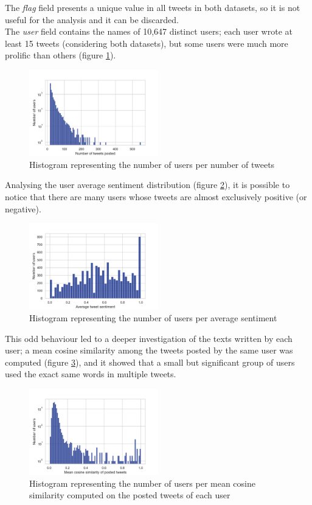 \documentclass[conference]{IEEEtran}
\begin{document}
The \textit{flag} field presents a unique value in all tweets in both datasets, so it is not useful for the analysis and it can be discarded. \\
The \textit{user} field contains the names of 10,647 distinct users; each user wrote at least 15 tweets (considering both datasets), but some users were much more prolific than others (figure \ref{fig:user_per_tweet}).
\begin{figure}
    \includegraphics[width=0.5\textwidth]{user_per_tweet}
    \caption[Histogram of users per tweets]{Histogram representing the number of users per number of tweets}
    \label{fig:user_per_tweet}
\end{figure}
Analysing the user average sentiment distribution (figure \ref{fig:average_user_sentiment}), it is possible to notice that there are many users whose tweets are almost exclusively positive (or negative).
\begin{figure}
    \includegraphics[width=0.5\textwidth]{average_user_sentiment}
    \caption[User average sentiment]{Histogram representing the number of users per average sentiment}
    \label{fig:average_user_sentiment}
\end{figure}
This odd behaviour led to a deeper investigation of the texts written by each user; a mean cosine similarity among the tweets posted by the same user was computed (figure \ref{fig:internal_similarity_users}), and it showed that a small but significant group of users used the exact same words in multiple tweets.  
\begin{figure}
    \includegraphics[width=0.5\textwidth]{internal_similarity_users}
    \caption[Mean cosine similarity]{Histogram representing the number of users per mean cosine similarity computed on the posted tweets of each user}
    \label{fig:internal_similarity_users}
\end{figure}
\end{document}
